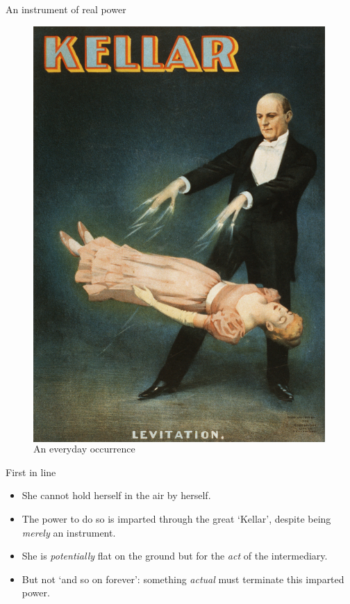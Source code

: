 \documentclass[xcolor=dvipsnames]{beamer}
\begin{document}
\begin{frame}{An instrument of real power}
\begin{figure}
\begin{columns}
    \centering
    \caption {An everyday occurrence}
    \includegraphics[width=0.99\textwidth]{levitation}
  \end{columns}
\end{figure}
\end{frame}


\begin{frame}[fragile]{First in line}
  \begin{itemize}
  \item She cannot hold herself in the air by herself. \vspace{5mm}
  \item The power to do so is imparted through the great `Kellar', despite being \emph{merely} an instrument. \vspace{5mm}
  \item She is \emph{potentially} flat on the ground but for the \emph{act} of the intermediary. \vspace{5mm}
  \item But not `and so on forever': something \emph{actual} must terminate this imparted power. \vspace{5mm}
  \end{itemize}
\end{frame}
\end{document}
